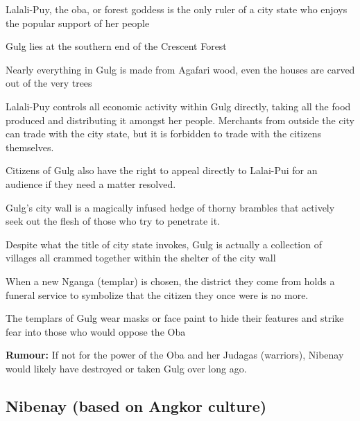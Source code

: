 \begin{description}
    \item Lalali-Puy, the oba, or forest goddess is the only ruler of a city state who enjoys the popular support of her people
    \item Gulg lies at the southern end of the Crescent Forest
    \item Nearly everything in Gulg is made from Agafari wood, even the houses are carved out of the very trees
    \item Lalali-Puy controls all economic activity within Gulg directly, taking all the food produced and distributing it amongst her people. Merchants from outside the city can trade with the city state, but it is forbidden to trade with the citizens themselves.
    \item Citizens of Gulg also have the right to appeal directly to Lalai-Pui for an audience if they need a matter resolved.
    \item Gulg’s city wall is a magically infused hedge of thorny brambles that actively seek out the flesh of those who try to penetrate it.
    \item Despite what the title of city state invokes, Gulg is actually a collection of villages all crammed together within the shelter of the city wall
    \item When a new Nganga (templar) is chosen, the district they come from holds a funeral service to symbolize that the citizen they once were is no more.
    \item The templars of Gulg wear masks or face paint to hide their features and strike fear into those who would oppose the Oba
    \item \textbf{Rumour:} If not for the power of the Oba and her Judagas (warriors), Nibenay would likely have destroyed or taken Gulg over long ago.
\end{description}

\subsection{Nibenay (based on Angkor culture)}

